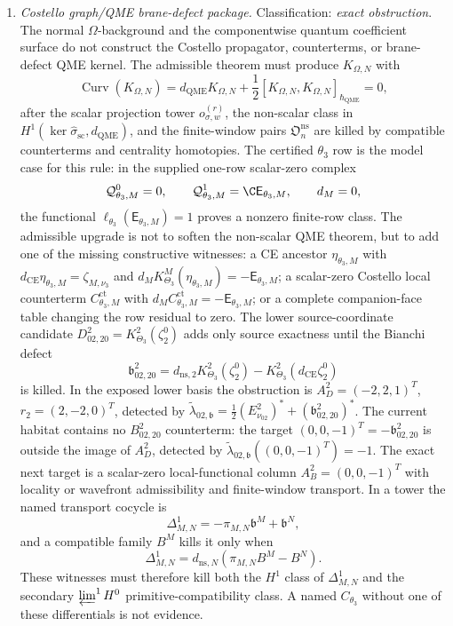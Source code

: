 \begin{enumerate}
  \item \emph{Costello graph/QME brane-defect package.}
  Classification: \emph{exact obstruction}.  The normal
  \(\Omega\)-background and the componentwise quantum coefficient surface
  do not construct the Costello propagator, counterterms, or
  brane-defect QME kernel.  The admissible theorem must produce
  \(K_{\Omega,N}\) with
  \[
    \operatorname{Curv}(K_{\Omega,N})
    =
    d_{\mathrm{QME}}K_{\Omega,N}
    +\frac12[K_{\Omega,N},K_{\Omega,N}]_{\hbar_{\mathrm{QME}}}=0,
  \]
  after the scalar projection tower \(o_{\sigma,w}^{(r)}\), the
  non-scalar class in
  \(H^1(\ker\widehat\sigma_{\mathrm{sc}},d_{\mathrm{QME}})\), and the
  finite-window pairs \(\mathfrak O_n^{\mathrm{ns}}\) are killed by
  compatible counterterms and centrality homotopies.
  The certified \(\theta_3\) row is the model case for this rule:
  in the supplied one-row scalar-zero complex
  \[
    \mathcal Q^0_{\theta_3,M}=0,\qquad
    \mathcal Q^1_{\theta_3,M}=\C\mathsf E_{\theta_3,M},\qquad d_M=0,
  \]
  the functional \(\ell_{\theta_3}(\mathsf E_{\theta_3,M})=1\)
  proves a nonzero finite-row class.  The admissible upgrade is not to
  soften the non-scalar QME theorem, but to add one of the missing
  constructive witnesses:
  a CE ancestor \(\eta_{\theta_3,M}\) with
  \(d_{\mathrm{CE}}\eta_{\theta_3,M}=\zeta_{M,\nu_3}\) and
  \(d_MK^M_{\Theta_3}(\eta_{\theta_3,M})=-\mathsf E_{\theta_3,M}\);
  a scalar-zero Costello local counterterm
  \(C^{\mathrm{ct}}_{\theta_3,M}\) with
  \(d_MC^{\mathrm{ct}}_{\theta_3,M}=-\mathsf E_{\theta_3,M}\);
  or a complete companion-face table changing the row residual to zero.
  The lower source-coordinate candidate
  \(D^2_{02,20}=K^2_{\Theta_3}(\zeta^0_2)\) adds only source exactness
  until the Bianchi defect
  \[
    \mathfrak b^2_{02,20}
    =
    d_{\mathrm{ns},2}K^2_{\Theta_3}(\zeta^0_2)
    -
    K^2_{\Theta_3}(d_{\mathrm{CE}}\zeta^0_2)
  \]
  is killed.  In the exposed lower basis the obstruction is
  \(A_D^2=(-2,2,1)^T\), \(r_2=(2,-2,0)^T\), detected by
  \(\widetilde\lambda_{02,\mathfrak b}
  =\frac12(E^2_{\nu_{02}})^*
  +(\mathfrak b^2_{02,20})^*\).  The current habitat contains no
  \(B^2_{02,20}\) counterterm: the target
  \((0,0,-1)^T=-\mathfrak b^2_{02,20}\) is outside the image of
  \(A_D^2\), detected by
  \(\widetilde\lambda_{02,\mathfrak b}((0,0,-1)^T)=-1\).  The exact next
  target is a scalar-zero local-functional column
  \(A_B^2=(0,0,-1)^T\) with locality or wavefront admissibility and
  finite-window transport.  In a tower the named transport cocycle is
  \[
    \Delta^1_{M,N}
    =
    -\pi_{M,N}\mathfrak b^M+\mathfrak b^N,
  \]
  and a compatible family \(B^M\) kills it only when
  \[
    \Delta^1_{M,N}
    =
    d_{\mathrm{ns},N}(\pi_{M,N}B^M-B^N).
  \]
  These witnesses must therefore kill both the \(H^1\) class of
  \(\Delta^1_{M,N}\) and the secondary \(\varprojlim^1H^0\)
  primitive-compatibility class.  A named \(C_{\theta_3}\) without one of
  these differentials is not evidence.


\end{enumerate}
